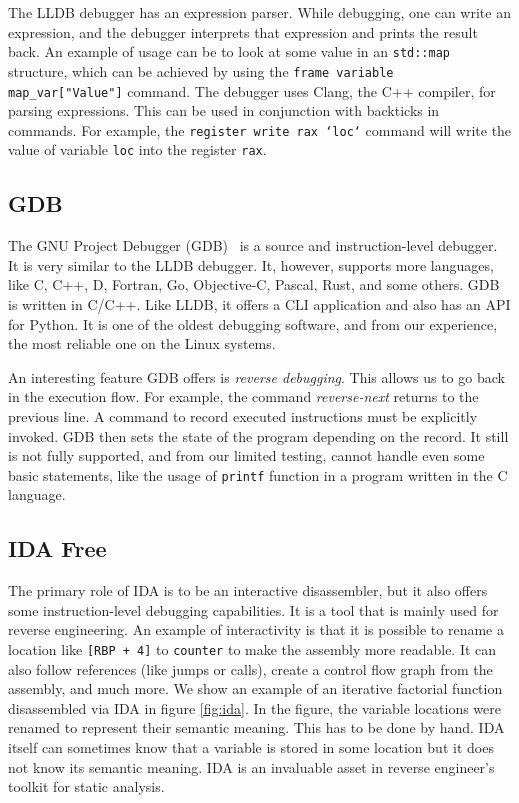 The LLDB debugger has an expression parser. While debugging, one can write an
expression, and the debugger interprets that expression and prints the result
back. An example of usage can be to look at some value in an \texttt{std::map}
structure, which can be achieved by using the \texttt{frame variable
map\_var["Value"]} command. The debugger uses Clang, the C++ compiler, for
parsing expressions. This can be used in conjunction with backticks in
commands. For example, the \texttt{register write rax `loc`} command will write
the value of variable \texttt{loc} into the register \texttt{rax}.

\subsection{GDB}
The GNU Project Debugger (GDB)~\cite{gdb-manual} is a source and
instruction-level debugger. It is very similar to the LLDB debugger.
It, however, supports more languages, like C, C++, D, Fortran, Go, Objective-C,
Pascal, Rust, and some others. GDB is written in C/C++. Like LLDB, it offers a
CLI application and also has an API for Python. It is one of the oldest
debugging software, and from our experience, the most reliable one on the Linux
systems.

An interesting feature GDB offers is \textit{reverse debugging}. This allows us
to go back in the execution flow. For example, the command
\textit{reverse-next} returns to the previous line. A command to record
executed instructions must be explicitly invoked. GDB then sets the state of
the program depending on the record. It still is not fully supported, and from
our limited testing, cannot handle even some basic statements, like the usage
of \texttt{printf} function in a program written in the C language.

\subsection{IDA Free}
The primary role of IDA is to be an interactive disassembler, but it also
offers some instruction-level debugging capabilities. It is a tool that is
mainly used for reverse engineering. An example of interactivity is that it is
possible to rename a location like \texttt{[RBP + 4]} to \texttt{counter} to
make the assembly more readable. It can also follow references (like jumps or
calls), create a control flow graph from the assembly, and much more. We show
an example of an iterative factorial function disassembled via IDA in figure
\ref{fig:ida}. In the figure, the variable locations were renamed to represent
their semantic meaning. This has to be done by hand. IDA itself can sometimes
know that a variable is stored in some location but it does not know its
semantic meaning. IDA is an invaluable asset in reverse engineer's toolkit
for static analysis.

